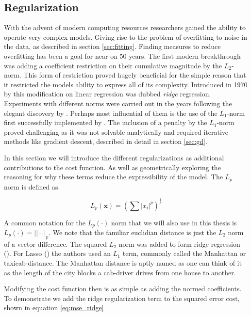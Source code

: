 \subsection{Regularization}

With the advent of modern computing resources researchers gained the ability to operate very complex models. Giving rise to the problem of overfitting to noise in the data, as described in section \ref{sec:fitting}. Finding measures to reduce overfitting has been a goal for near on $50$ years. The first modern breakthrough was adding a coefficient restriction on their cumulative magnitude by the $L_2$-norm. This form of restriction proved hugely beneficial for the simple reason that it restricted the models ability to express all of its complexity. Introduced in 1970 by \citet{Hoerl1970} this modification on linear regression was dubbed \textit{ridge} regression. Experiments with different norms were carried out in the years following the elegant discovery by \cite{Hoerl1970}. Perhaps most influential of them is the use of the $L_1$-norm first successfully implemented by \citet{Tibshirani1996}. The inclusion of a penalty by the $L_1$-norm proved challenging as it was not solvable analytically and required iterative methods like gradient descent, described in detail in section \ref{sec:gd}. 

In this section we will introduce the different regularizations as additional contributions to the cost function. As well as geometrically exploring the reasoning for why these terms reduce the expressibility of the model. The $L_p$ norm is defined as. 

\begin{equation}
L_p(\mathbf{x}) = \left(\sum |x_i|^p\right)^{\frac{1}{p}}
\end{equation}

\noindent A common notation for the $L_p(\cdot)$ norm that we will also use in this thesis is $L_p(\cdot) = ||\cdot||_p$. We note that the familiar euclidian distance is just the $L_2$ norm of a vector difference. The squared $L_2$ norm was added to form ridge regression (\cite{Hoerl1970}). For Lasso (\cite{Tibshirani1996}) the authors used an $L_1$ term, commonly called the Manhattan or taxicab-distance. The Manhattan distance is aptly named as one can think of it as the length of the city blocks a cab-driver drives from one house to another.

Modifying the cost function then is as simple as adding the normed coefficients. To demonstrate we add the ridge regularization term to the squared error cost, shown in equation \ref{eq:mse_ridge}

